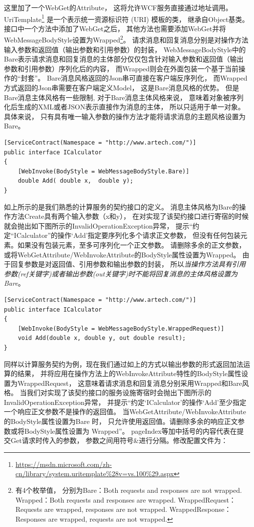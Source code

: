 \documentclass{book}
\begin{document}
这里加了一个WebGet的Attribute，
这将允许WCF服务直接通过地址调用。
UriTemplate\footnote{\url{https://msdn.microsoft.com/zh-cn/library/system.uritemplate\%28v=vs.100\%29.aspx}}
是一个表示统一资源标识符 (URI) 模板的类，
继承自Object基类。
接口中一个方法中添加了WebGet之后，
其他方法也需要添加WebGet并将WebMessageBodyStyle设置为Wrapped\footnote{有4个枚举值，
分别为Bare：Both requests and responses are not wrapped.
Wrapped：Both requests and responses are wrapped.
WrappedRequest：Requests are wrapped, responses are not wrapped.
WrappedResponse：Responses are wrapped, requests are not wrapped.}。
请求消息和回复消息分别是对操作方法输入参数和返回值（输出参数和引用参数）的封装，
WebMessageBodyStyle中的Bare表示请求消息和回复消息的主体部分仅仅包含针对输入参数和返回值（输出参数和引用参数）序列化后的内容，
而Wrapped则会在外面包装一个基于当前操作的“封套”。
Bare消息风格返回的Json串可直接在客户端反序列化，
而Wrapped方式返回的Json串需要在客户端定义Model，
这是Bare消息风格的优势。
但是Bare消息主体风格有一些限制,
对于Bare消息主体风格来说，
意味着对象被序列化后生成的XML或者JSON表示直接作为消息的主体，
所以只适用于单一对象。具体来说，
只有具有唯一输入参数的操作方法才能将请求消息的主题风格设置为Bare。

\begin{lstlisting}[language={[Sharp]C}]
[ServiceContract(Namespace = "http://www.artech.com/")]
public interface ICalculator
{
	[WebInvoke(BodyStyle = WebMessageBodyStyle.Bare)]
	double Add( double x,  double y);
}
\end{lstlisting}

如上所示的是我们熟悉的计算服务的契约接口的定义。
消息主体风格为Bare的操作方法Create具有两个输入参数（x和y），
在对实现了该契约接口进行寄宿的时候就会抛出如下图所示的InvalidOperationException异常，
提示“约定“ICalculator”的操作‘Add’指定要序列化多个请求正文参数，
但没有任何包装元素。如果没有包装元素，至多可序列化一个正文参数。
请删除多余的正文参数，
或将WebGetAttribute/WebInvokeAttribute的BodyStyle属性设置为Wrapped。
由于回复参数是对返回值、引用参数和输出参数的封装，
所以\emph{当操作方法具有引用参数(ref关键字)或者输出参数(out关键字)时不能将回复消息的主体风格设置为Bare}。

\begin{lstlisting}[language={[Sharp]C}]
[ServiceContract(Namespace = "http://www.artech.com/")]
public interface ICalculator
{
	[WebInvoke(BodyStyle = WebMessageBodyStyle.WrappedRequest)]
	void Add(double x, double y, out double result);
}
\end{lstlisting}

同样以计算服务契约为例，现在我们通过如上的方式以输出参数的形式返回加法运算的结果，
并将应用在操作方法上的WebInvokeAttribute特性的BodyStyle属性设置为WrappedRequest，
这意味着请求消息和回复消息分别采用Wrapped和Bare风格。
当我们对实现了该契约接口的服务设施寄宿时会抛出下图所示的InvalidOperationException异常，
并提示“约定‘ICalculator’的操作‘Add’至少指定一个响应正文参数不是操作的返回值。
当WebGetAttribute/WebInvokeAttribute的BodyStyle属性设置为Bare 时，
只允许使用返回值。请删除多余的响应正文参数或将BodyStyle属性设置为 Wrapped”。
pageIndex等加中括号的内容代表在提交Get请求时传入的参数，
参数之间用符号\&进行分隔。修改配置文件为：
\end{document}
